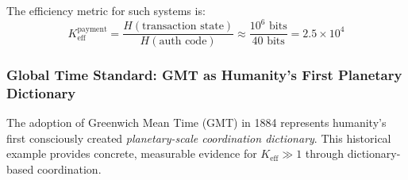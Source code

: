 \documentclass[11pt,a4paper]{article}
\begin{document}
	The efficiency metric for such systems is:
	\begin{equation}
		K_{\mathrm{eff}}^{\text{payment}} = \frac{H(\text{transaction state})}{H(\text{auth code})} \approx \frac{10^6 \text{ bits}}{40 \text{ bits}} = 2.5 \times 10^4
	\end{equation}
	
	\subsubsection{Global Time Standard: GMT as Humanity's First Planetary Dictionary}
	\label{subsec:gmt-dictionary}
	
	The adoption of Greenwich Mean Time (GMT) in 1884 represents humanity's first consciously created \textit{planetary-scale coordination dictionary}. This historical example provides concrete, measurable evidence for $K_{\mathrm{eff}} \gg 1$ through dictionary-based coordination.
	
\end{document}
